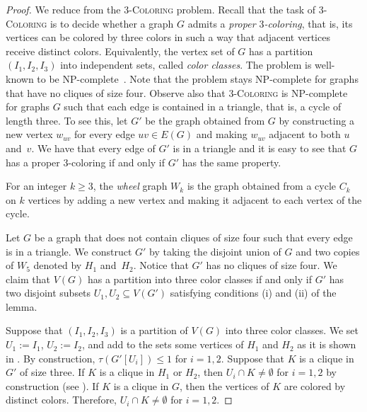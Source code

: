 \documentclass[11pt]{article}
\theoremstyle{definition}
\newcommand{\NP}{\textup{\textsf{NP}}}
\begin{document}
\begin{proof}
We reduce from the $3$-\textsc{Coloring} problem. Recall that the task of $3$-\textsc{Coloring} is to decide whether a graph $G$ admits a \emph{proper $3$-coloring}, that is, its vertices can be colored by three colors in such a way that adjacent vertices receive distinct colors. Equivalently,
the vertex set of $G$ has a partition $(I_1,I_2,I_3)$ into independent sets, called \emph{color classes}.
The problem is well-known to be \NP-complete~\cite{GareyJ79}. Note that the problem stays \NP-complete for graphs that
have no cliques of size four.
Observe also that $3$-\textsc{Coloring} is \NP-complete for graphs $G$ such that each edge is contained in a triangle, that is, a cycle of length three.
To see this, let $G'$ be the graph obtained from $G$ by constructing a new vertex $w_{uv}$ for every edge $uv\in E(G)$ and making $w_{uv}$ adjacent to both $u$ and~$v$. We have that every edge of $G'$ is in a triangle and it is easy to see that $G$ has a proper $3$-coloring if and only if $G'$ has the same property.

For an integer $k\geq 3$, the \emph{wheel} graph $W_k$ is the graph obtained from a cycle $C_k$ on $k$ vertices by adding a new vertex and making it adjacent to each vertex of the cycle.

Let $G$ be a graph that does not contain cliques of size four such that every edge is in a triangle. We construct $G'$ by taking the disjoint union of $G$ and two copies of $W_5$ denoted by $H_1$ and~$H_2$. Notice that $G'$ has no cliques of size four.
We claim that $V(G)$ has a partition into three color classes if and only if $G'$ has two disjoint subsets $U_1,U_2\subseteq V(G')$ satisfying conditions (i) and (ii) of the lemma.

Suppose that $(I_1,I_2,I_3)$ is a partition of $V(G)$ into three color classes. We set $U_1:=I_1$, $U_2:=I_2$, and add to the sets some vertices of $H_1$ and $H_2$ as it is shown in .
By construction, $\tau(G'[U_i])\leq 1$ for $i=1,2$.
Suppose that $K$ is a clique in $G'$ of size three.
If $K$ is a clique in $H_1$ or $H_2$, then $U_i\cap K\neq \emptyset$ for $i=1,2$ by construction (see ). If $K$ is a clique in $G$, then the vertices of $K$ are colored by distinct colors. Therefore, $U_i\cap K\neq \emptyset$ for $i=1,2$.


\end{proof}
\end{document}

